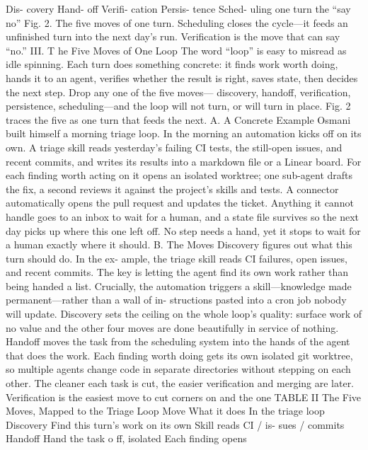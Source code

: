 \documentclass[conference]{IEEEtran}
\begin{document}

Dis-
covery
Hand-
off
Verifi-
cation
Persis-
tence
Sched-
uling
one
turn
the “say no”
Fig. 2. The five moves of one turn. Scheduling closes the cycle—it
feeds an unfinished turn into the next day’s run. Verification is the
move that can say “no.”
III. T he Five Moves of One Loop
The word “loop” is easy to misread as idle spinning. Each
turn does something concrete: it finds work worth doing, hands
it to an agent, verifies whether the result is right, saves state,
then decides the next step. Drop any one of the five moves—
discovery, handoff, verification, persistence, scheduling—and
the loop will not turn, or will turn in place. Fig. 2 traces the five
as one turn that feeds the next.
A. A Concrete Example
Osmani built himself a morning triage loop. In the morning an
automation kicks off on its own. A triage skill reads yesterday’s
failing CI tests, the still-open issues, and recent commits, and
writes its results into a markdown file or a Linear board. For
each finding worth acting on it opens an isolated worktree; one
sub-agent drafts the fix, a second reviews it against the project’s
skills and tests. A connector automatically opens the pull request
and updates the ticket. Anything it cannot handle goes to an
inbox to wait for a human, and a state file survives so the next
day picks up where this one left off. No step needs a hand, yet it
stops to wait for a human exactly where it should.
B. The Moves
Discovery figures out what this turn should do. In the ex-
ample, the triage skill reads CI failures, open issues, and recent
commits. The key is letting the agent find its own work rather
than being handed a list. Crucially, the automation triggers a
skill—knowledge made permanent—rather than a wall of in-
structions pasted into a cron job nobody will update. Discovery
sets the ceiling on the whole loop’s quality: surface work of no
value and the other four moves are done beautifully in service of
nothing.
Handoff moves the task from the scheduling system into the
hands of the agent that does the work. Each finding worth doing
gets its own isolated git worktree, so multiple agents change
code in separate directories without stepping on each other. The
cleaner each task is cut, the easier verification and merging are
later.
Verification is the easiest move to cut corners on and the one
TABLE II
The Five Moves, Mapped to the Triage Loop
Move What it does In the triage loop
Discovery Find this turn’s
work on its own
Skill reads CI / is-
sues / commits
Handoff Hand the task o ff,
isolated
Each finding opens
\end{document}
